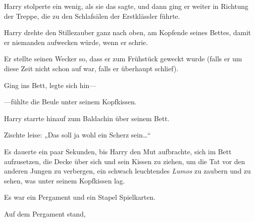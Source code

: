 Harry stolperte ein wenig, als sie das sagte, und dann ging er weiter in Richtung der Treppe, die zu den Schlafsälen der Erstklässler führte.

\later

Harry drehte den Stillezauber ganz nach oben, am Kopfende seines Bettes, damit er niemanden aufwecken würde, wenn er schrie.

Er stellte seinen Wecker so, dass er zum Frühstück geweckt wurde (falls er um diese Zeit nicht schon auf war, falls er überhaupt schlief).

Ging ins Bett, legte sich hin—

—fühlte die Beule unter seinem Kopfkissen.

Harry starrte hinauf zum Baldachin über seinem Bett.

Zischte leise: „Das soll ja wohl ein Scherz sein…“

Es dauerte ein paar Sekunden, bis Harry den Mut aufbrachte, sich im Bett aufzusetzen, die Decke über sich und sein Kissen zu ziehen, um die Tat vor den anderen Jungen zu verbergen, ein schwach leuchtendes \emph{Lumos} zu zaubern und zu sehen, was unter seinem Kopfkissen lag.

Es war ein Pergament und ein Stapel Spielkarten.

Auf dem Pergament stand,

